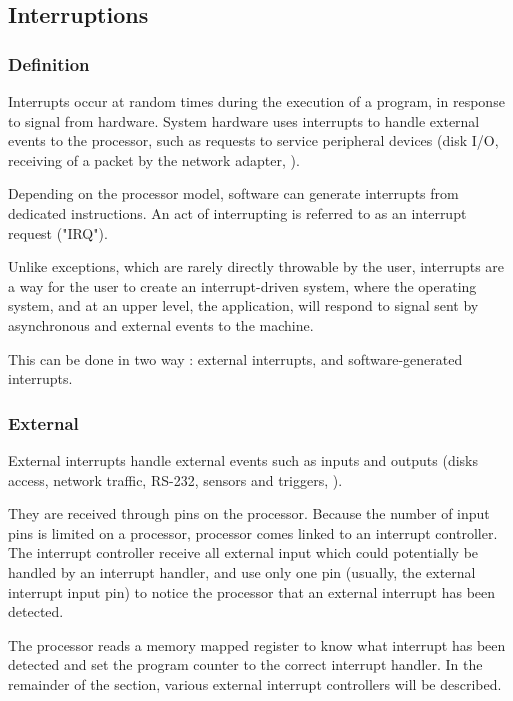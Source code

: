 
\subsection{Interruptions}


\begin{frame}
  \frametitle{Definition}

Interrupts occur at random times during the execution of a program, in response to signal from hardware. System hardware uses interrupts to handle external events to the processor, such as requests to service peripheral devices (disk I/O, receiving of a packet by the network adapter, \etc{}).

\-

Depending on the processor model, software can generate interrupts from dedicated instructions. An act of interrupting is referred to as an interrupt request ("IRQ").

\-

Unlike exceptions, which are rarely directly throwable by the user, interrupts are a way for the user to create an interrupt-driven system, where the operating system, and at an upper level, the application, will respond to signal sent by asynchronous and external events to the machine.

\-

This can be done in two way : external interrupts, and software-generated interrupts.

\end{frame}


\begin{frame}
  \frametitle{External}

External interrupts handle external events such as inputs and outputs (disks access, network traffic, RS-232, sensors and triggers, \etc{}).

\-

They are received through pins on the processor. Because the number of input pins is limited on a processor, processor comes linked to an interrupt controller. The interrupt controller receive all external input which could potentially be handled by an interrupt handler, and use only one pin (usually, the external interrupt input pin) to notice the processor that an external interrupt has been detected.

\-

The processor reads a memory mapped register to know what interrupt has been detected and set the program counter to the correct interrupt handler. In the remainder of the section, various external interrupt controllers will be described.

\end{frame}

